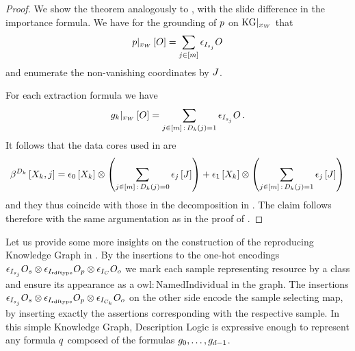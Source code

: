 \begin{proof}
    We show the theorem analogously to , with the slide difference in the importance formula.
    We have for the grounding of $p$ on $\mathrm{KG}|_{x_{W}}$ that
    \begin{align*}
        {p}|_{x_{W}}\left[O\right] = \sum_{j\in[m]}  \epsilon_{I_{s_j}}{O}
    \end{align*}
    and enumerate the non-vanishing coordinates by $J$.

    For each extraction formula we have
    \begin{align*}
        {g_{k}}|_{x_{W}}\left[O\right] = \sum_{j\in[m] \, : \, D_{k}(j)=1} \epsilon_{I_{s_j}}{O} \,.
    \end{align*}
    It follows that the data cores used in  are
    \begin{align*}
        \beta^{D_k}\left[X_{k},j\right]
        = \epsilon_{0}\left[X_{k}\right] \otimes \left(\sum_{j\in[m] \, : \, D_{k}(j)=0} \epsilon_{j}\left[J\right]\right)
        +\epsilon_{1}\left[X_{k}\right] \otimes \left(\sum_{j\in[m] \, : \, D_{k}(j)=1} \epsilon_{j}\left[J\right]\right)
    \end{align*}
    and they thus coincide with those in the decomposition in .
    The claim follows therefore with the same argumentation as in the proof of .
\end{proof}

%
Let us provide some more insights on the construction of the reproducing Knowledge Graph in .
By the insertions to the one-hot encodings $\epsilon_{I_{s_j}}{O_{s}} \otimes \epsilon_{I_{\mathrm{rdf}\mathrm{type}}}{O_{p}} \otimes \epsilon_{I_{C}}{O_{o}}$ we mark each sample representing resource by a class and ensure its appearance as a $\mathrm{owl:NamedIndividual}$ in the graph.
The insertions $\epsilon_{I_{s_j}}{O_{s}}\otimes \epsilon_{I_{\mathrm{rdf}\mathrm{type}}}{O_{p}} \otimes \epsilon_{I_{C_k}}{O_{o}}$ on the other side encode the sample selecting map, by inserting exactly the assertions corresponding with the respective sample.
% 
In this simple Knowledge Graph, Description Logic is expressive enough to represent any formula $q$ composed of the formulas $g_{0},\ldots,g_{d-1}$.

